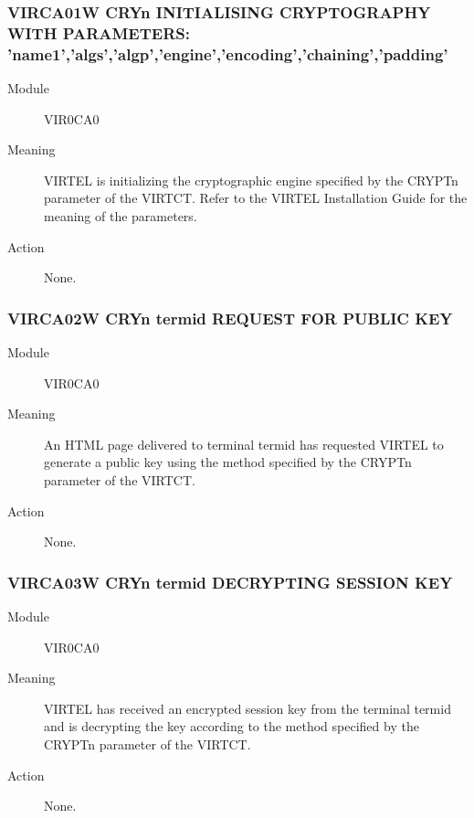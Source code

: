 \documentclass[letterpaper,10pt,english]{sphinxmanual}
\begin{document}
\subsubsection{VIRCA01W CRYn INITIALISING CRYPTOGRAPHY WITH PARAMETERS: ’name1’,’algs’,’algp’,’engine’,’encoding’,’chaining’,’padding’}
\label{\detokenize{messages:virca01w-cryn-initialising-cryptography-with-parameters-name1-algs-algp-engine-encoding-chaining-padding}}\begin{description}
\item[{Module}] \leavevmode
VIR0CA0

\item[{Meaning}] \leavevmode
VIRTEL is initializing the cryptographic engine specified by the CRYPTn parameter of the VIRTCT. Refer to the VIRTEL Installation Guide for the meaning of the parameters.

\item[{Action}] \leavevmode
None.

\end{description}


\subsubsection{VIRCA02W CRYn termid REQUEST FOR PUBLIC KEY}
\label{\detokenize{messages:virca02w-cryn-termid-request-for-public-key}}\begin{description}
\item[{Module}] \leavevmode
VIR0CA0

\item[{Meaning}] \leavevmode
An HTML page delivered to terminal termid has requested VIRTEL to generate a public key using the method specified by the CRYPTn parameter of the VIRTCT.

\item[{Action}] \leavevmode
None.

\end{description}


\subsubsection{VIRCA03W CRYn termid DECRYPTING SESSION KEY}
\label{\detokenize{messages:virca03w-cryn-termid-decrypting-session-key}}\begin{description}
\item[{Module}] \leavevmode
VIR0CA0

\item[{Meaning}] \leavevmode
VIRTEL has received an encrypted session key from the terminal termid and is decrypting the key according to the method specified by the CRYPTn parameter of the VIRTCT.

\item[{Action}] \leavevmode
None.

\end{description}
\end{document}
